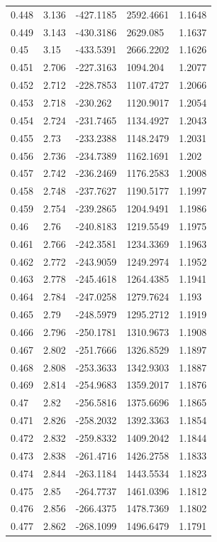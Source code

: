 \begin{tabular}{lllll}
0.448 & 3.136 & -427.1185 & 2592.4661 & 1.1648 \\
0.449 & 3.143 & -430.3186 & 2629.085 & 1.1637 \\
0.45 & 3.15 & -433.5391 & 2666.2202 & 1.1626 \\
0.451 & 2.706 & -227.3163 & 1094.204 & 1.2077 \\
0.452 & 2.712 & -228.7853 & 1107.4727 & 1.2066 \\
0.453 & 2.718 & -230.262 & 1120.9017 & 1.2054 \\
0.454 & 2.724 & -231.7465 & 1134.4927 & 1.2043 \\
0.455 & 2.73 & -233.2388 & 1148.2479 & 1.2031 \\
0.456 & 2.736 & -234.7389 & 1162.1691 & 1.202 \\
0.457 & 2.742 & -236.2469 & 1176.2583 & 1.2008 \\
0.458 & 2.748 & -237.7627 & 1190.5177 & 1.1997 \\
0.459 & 2.754 & -239.2865 & 1204.9491 & 1.1986 \\
0.46 & 2.76 & -240.8183 & 1219.5549 & 1.1975 \\
0.461 & 2.766 & -242.3581 & 1234.3369 & 1.1963 \\
0.462 & 2.772 & -243.9059 & 1249.2974 & 1.1952 \\
0.463 & 2.778 & -245.4618 & 1264.4385 & 1.1941 \\
0.464 & 2.784 & -247.0258 & 1279.7624 & 1.193 \\
0.465 & 2.79 & -248.5979 & 1295.2712 & 1.1919 \\
0.466 & 2.796 & -250.1781 & 1310.9673 & 1.1908 \\
0.467 & 2.802 & -251.7666 & 1326.8529 & 1.1897 \\
0.468 & 2.808 & -253.3633 & 1342.9303 & 1.1887 \\
0.469 & 2.814 & -254.9683 & 1359.2017 & 1.1876 \\
0.47 & 2.82 & -256.5816 & 1375.6696 & 1.1865 \\
0.471 & 2.826 & -258.2032 & 1392.3363 & 1.1854 \\
0.472 & 2.832 & -259.8332 & 1409.2042 & 1.1844 \\
0.473 & 2.838 & -261.4716 & 1426.2758 & 1.1833 \\
0.474 & 2.844 & -263.1184 & 1443.5534 & 1.1823 \\
0.475 & 2.85 & -264.7737 & 1461.0396 & 1.1812 \\
0.476 & 2.856 & -266.4375 & 1478.7369 & 1.1802 \\
0.477 & 2.862 & -268.1099 & 1496.6479 & 1.1791 \\

\end{tabular}
